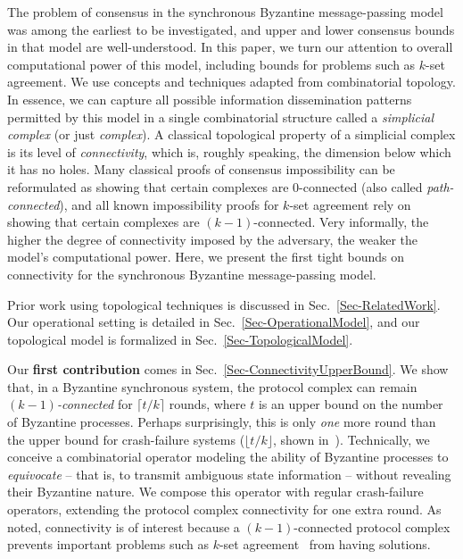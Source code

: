\documentclass[11pt]{article}
\begin{document}
The problem of consensus in the synchronous Byzantine message-passing
model was among the earliest to be investigated,
and upper and lower consensus bounds in that model are well-understood.
In this paper,
we turn our attention to overall computational power of this model,
including bounds for problems such as $k$-set agreement.
We use concepts and techniques adapted from combinatorial topology.
In essence,
we can capture all possible information dissemination patterns
permitted by this model in a single combinatorial structure called a
\emph{simplicial complex} (or just \emph{complex}).
A classical topological property of a simplicial complex is its level
of \emph{connectivity}, which is, roughly speaking, the dimension below
which it has no holes.
Many classical proofs of consensus impossibility can be reformulated
as showing that certain complexes are 0-connected
(also called \emph{path-connected}),
and all known impossibility proofs for $k$-set agreement rely on
showing that certain complexes are $(k-1)$-connected.
Very informally, the higher the degree of connectivity imposed by the adversary,
the weaker the model's computational power.
Here, we present the first tight bounds on connectivity for the
synchronous Byzantine message-passing model.

Prior work using topological techniques is discussed in Sec.~\ref{Sec-RelatedWork}.
Our operational setting is detailed in Sec.~\ref{Sec-OperationalModel},
and our topological model is formalized in Sec.~\ref{Sec-TopologicalModel}.

Our \textbf{first contribution} comes in Sec.~\ref{Sec-ConnectivityUpperBound}.
We show that,
in a Byzantine synchronous system,
the protocol complex can remain \emph{$(k - 1)$-connected} for $\lceil t/k \rceil$ rounds,
where $t$ is an upper bound on the number of Byzantine processes.
Perhaps surprisingly,
this is only \emph{one} more round than the upper bound for crash-failure systems
($\lfloor t/k \rfloor$, shown in~\cite{ChaudhuriHLT2000}).
Technically,
we conceive a combinatorial operator modeling the ability of Byzantine processes
to \emph{equivocate} -- that is,
to transmit ambiguous state information --
without revealing their Byzantine nature.
We compose this operator with regular crash-failure operators,
extending the protocol complex connectivity for one extra round.
As noted, connectivity is of interest because a $(k - 1)$-connected
protocol complex prevents important problems such as $k$-set
agreement~\cite{ksetagreement,dePriscoMR2001} from having solutions.
\end{document}
